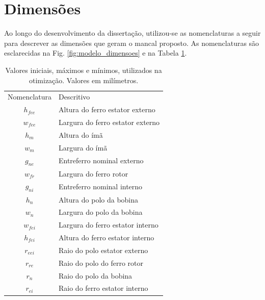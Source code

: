 
\section{Dimensões}

Ao longo do desenvolvimento da dissertação, utilizou-se as nomenclaturas a seguir para descrever as dimensões que geram o mancal proposto. As nomenclaturas são esclarecidas na Fig. \ref{fig:modelo_dimensoes} e na Tabela \ref{tab:modelo:dimensoes:nomenclatura}.

\begin{table}[ht!]
	\centering
	\begin{tabular}{c l}
		Nomenclatura & Descritivo \\
		$h_{fee}$	& Altura do ferro estator externo \\
		$w_{fee}$	& Largura do ferro estator externo\\
		
		$h_m$		& Altura do ímã \\
		$w_m$		& Largura do ímã \\

		$g_{ne}$	& Entreferro nominal externo \\
		
		$w_{fr}$	& Largura do ferro rotor \\
		
		$g_{ni}$	& Entreferro nominal interno \\
		
		$h_n$		& Altura do polo da bobina \\
		$w_n$		& Largura do polo da bobina \\
		
		$w_{fei}$	& Largura do ferro estator interno \\
		$h_{fei}$	& Altura do ferro estator interno \\

		$r_{eei}$	& Raio do polo estator externo \\				
		$r_{re}$	& Raio do polo do ferro rotor \\		
		$r_{n}$		& Raio do polo da bobina \\		
		$r_{ei}$	& Raio do ferro estator interno \\		
		
	\end{tabular} 
	\caption{Valores iniciais, máximos e mínimos, utilizados na otimização. Valores em milímetros.}
	\label{tab:modelo:dimensoes:nomenclatura}
\end{table}


